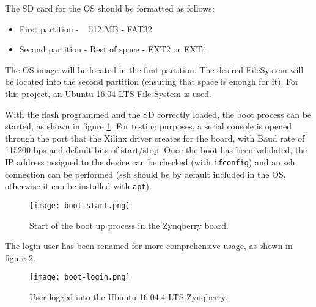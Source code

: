 The SD card for the OS should be formatted as follows:

\begin{itemize}
	\item First partition - ~ 512 MB - FAT32
	\item Second partition - Rest of space - EXT2 or EXT4
\end{itemize}

The OS image will be located in the first partition. The desired FileSystem will be located into the
second partition (ensuring that space is enough for it). For this project, an Ubuntu 16.04 LTS
File System is used.

With the flash programmed and the SD correctly loaded, the boot process can be started, as shown in
figure \ref{fig:boot-start}. For testing purposes, a serial console is opened through the port
that the Xilinx driver creates for the board, with Baud rate of 115200 bps and default bits of
start/stop. Once the boot has been validated, the IP address assigned to the device can be checked
(with \texttt{ifconfig}) and an ssh connection can be performed (ssh should be by default included
in the OS, otherwise it can be installed with \texttt{apt}).

\begin{figure}[htp]
	\centering
	\texttt{[image: boot-start.png]}
	\caption{Start of the boot up process in the Zynqberry board.}
	\label{fig:boot-start}
\end{figure}

The login user has been renamed for more comprehensive usage, as shown in figure 
\ref{fig:boot-login}.

\begin{figure}[htp]
	\centering
	\texttt{[image: boot-login.png]}
	\caption{User logged into the Ubuntu 16.04.4 LTS Zynqberry.}
	\label{fig:boot-login}
\end{figure}
